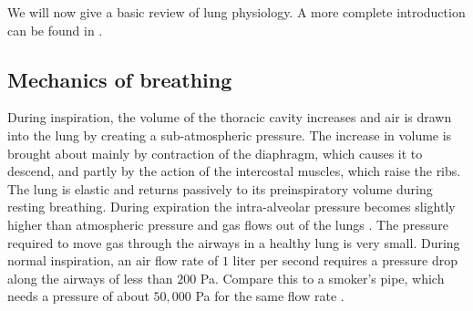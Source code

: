 We will now give a basic review of lung physiology. A more complete introduction can be found in \citet{west2008respiratory,cotes2009lung}.
 
\subsection{Mechanics of breathing} 
During inspiration, the volume of the thoracic cavity increases and air is drawn into the lung by creating a sub-atmospheric pressure. The increase in volume is brought about mainly by contraction of the diaphragm, which causes it to descend, and partly by the action of the intercostal muscles, which raise the ribs. 
The lung is elastic and returns passively to its preinspiratory volume during resting breathing. 
During expiration the intra-alveolar pressure becomes slightly higher than atmospheric pressure and gas flows out of the
lungs \citep{west2008respiratory}. 
The pressure required to move gas through the airways in a healthy lung is very small. During normal inspiration, an air flow rate of $1$ liter per second requires a pressure drop along the airways of less than $200$ Pa. Compare this to a smoker’s pipe, which needs a pressure of about $50,000$ Pa for the same flow rate \citep{west2008respiratory}.

